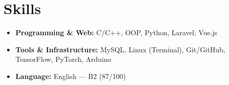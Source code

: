 \section{Skills}

\begin{itemize}[leftmargin=1.5em, itemsep=2pt, topsep=2pt]
  \item \textbf{Programming \& Web:} C/C++, OOP, Python, Laravel, Vue.js
  \item \textbf{Tools \& Infrastructure:} MySQL, Linux (Terminal), Git/GitHub, TensorFlow, PyTorch, Arduino
  \item \textbf{Language:} English — B2 (87/100)
\end{itemize}
